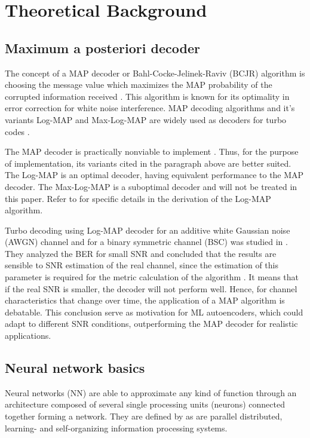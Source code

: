 \documentclass[conference]{IEEEtran}
\begin{document}
\section{Theoretical Background}


\subsection{Maximum a posteriori decoder}


The concept of a MAP decoder or Bahl-Cocke-Jelinek-Raviv (BCJR) algorithm is choosing the message value which maximizes the MAP probability of the corrupted information received \cite{b4}. This algorithm is known for its optimality in error correction for white noise interference. MAP decoding algorithms and it's variants Log-MAP and Max-Log-MAP are widely used as decoders for turbo codes \cite{b7}. 

The MAP decoder is practically nonviable to implement \cite{b6}. Thus, for the purpose of implementation, its variants cited in the paragraph above are better suited. The Log-MAP is an optimal decoder, having equivalent performance to the MAP decoder. The Max-Log-MAP is a suboptimal decoder and will not be treated in this paper. Refer to \cite{b6} for specific details in the derivation of the Log-MAP algorithm.

Turbo decoding using Log-MAP decoder for an additive white Gaussian noise (AWGN) channel and for a binary symmetric channel (BSC) was studied in \cite{b5}. They analyzed the BER for small SNR and concluded that the results are sensible to SNR estimation of the real channel, since the estimation of this parameter is required for the metric calculation of the algorithm \cite{b6}. It means that if the real SNR is smaller, the decoder will not perform well. Hence, for channel characteristics that change over time, the application of a MAP algorithm is debatable. This conclusion serve as motivation for ML autoencoders, which could adapt to different SNR conditions, outperforming the MAP decoder for realistic applications.

\subsection{Neural network basics}

Neural networks (NN) are able to approximate any kind of function through an architecture composed of several single processing units (neurons) connected together forming a network. They are defined by \cite{b9} as are parallel distributed, learning- and self-organizing information processing systems. 
\end{document}

